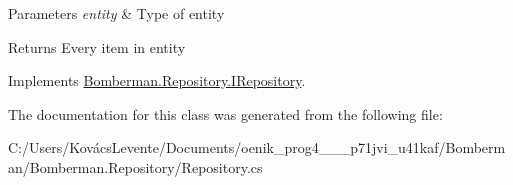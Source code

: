 \begin{DoxyParams}{Parameters}
{\em entity} & Type of entity\\
\hline
\end{DoxyParams}
\begin{DoxyReturn}{Returns}
Every item in entity
\end{DoxyReturn}


Implements \mbox{\hyperlink{interface_bomberman_1_1_repository_1_1_i_repository_a5d04a798b7326f2c05f77a29dd0de285}{Bomberman.\+Repository.\+I\+Repository}}.



The documentation for this class was generated from the following file\+:\begin{DoxyCompactItemize}
\item 
C\+:/\+Users/\+Kovács\+Levente/\+Documents/oenik\+\_\+prog4\+\_\+\_\+\_\+p71jvi\+\_\+u41kaf/\+Bomberman/\+Bomberman.\+Repository/Repository.\+cs\end{DoxyCompactItemize}
